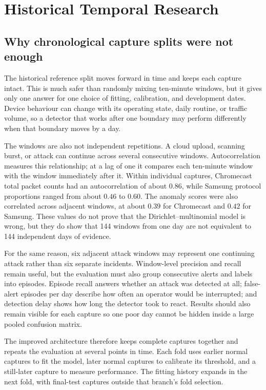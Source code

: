 \section{Historical Temporal Research}
\label{sec:temporal-research}

\subsection{Why chronological capture splits were not enough}

The historical reference split moves forward in time and keeps each capture intact.
This is much safer than randomly mixing ten-minute windows, but it gives only one
answer for one choice of fitting, calibration, and development dates. Device
behaviour can change with its operating state, daily routine, or traffic volume,
so a detector that works after one boundary may perform differently when that
boundary moves by a day.

The windows are also not independent repetitions. A cloud upload, scanning
burst, or attack can continue across several consecutive windows. Autocorrelation
measures this relationship; at a lag of one it compares each ten-minute window
with the window immediately after it. Within individual captures, Chromecast
total packet counts had an autocorrelation of about $0.86$, while Samsung
protocol proportions ranged from about $0.46$ to $0.60$. The anomaly scores were
also correlated across adjacent windows, at about $0.39$ for Chromecast and
$0.42$ for Samsung. These values do not prove that the Dirichlet--multinomial
model is wrong, but they do show that 144 windows from one day are not equivalent
to 144 independent days of evidence.

For the same reason, six adjacent attack windows may represent one continuing
attack rather than six separate incidents. Window-level precision and recall
remain useful, but the evaluation must also group consecutive alerts and labels
into episodes. Episode recall answers whether an attack was detected at all;
false-alert episodes per day describe how often an operator would be interrupted;
and detection delay shows how long the detector took to react. Results should
also remain visible for each capture so one poor day cannot be hidden inside a
large pooled confusion matrix.

The improved architecture therefore keeps complete captures together and repeats
the evaluation at several points in time. Each fold uses earlier normal captures
to fit the model, later normal captures to calibrate its threshold, and a
still-later capture to measure performance. The fitting history expands in the
next fold, with final-test captures outside that branch’s fold selection.

